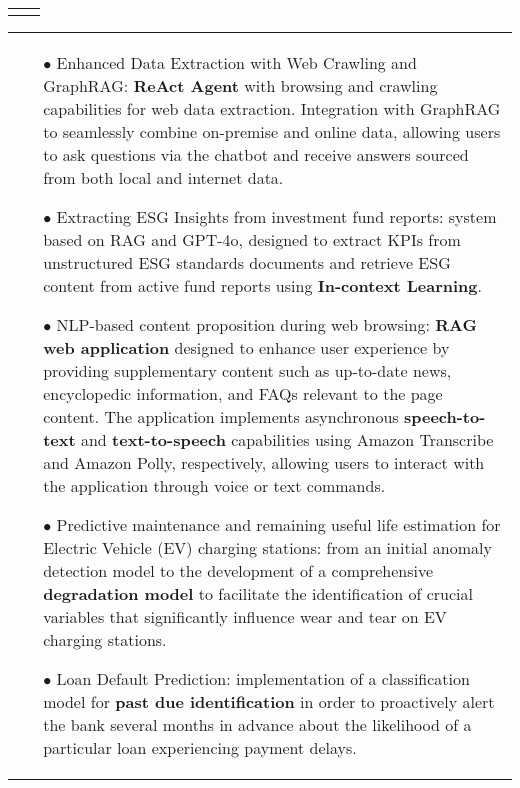 \documentclass[11pt,a4paper,sans,english]{moderncv}
\makeatletter
\renewcommand*{\cventry}[6][.25em]{%
	\vspace{1.5mm}%
	\begin{tabular*}{\textwidth}{@{\extracolsep{\fill}}ll}%
		\ifthenelse{\equal{#3}{}}{}{\textbf{#3}} &
		\ifthenelse{\equal{#2}{}}{}{#4 #6 #2}\\%
	\end{tabular*}%
	\par\addvspace{#1}}
\newcommand*{\mycvitem}[2][.25em]{%
	\vspace{-.25em}
	\begin{tabular}{@{}p{\textwidth}@{}}%
		\small#2%
	\end{tabular}%
	\par\addvspace{-0.7em}  %
}
\newcommand*{\cvtag}[1]{%
	\textcolor{lightgray!50!black}{\fbox{\mathstrut\scriptsize\textsf{\textbf{#1}}}}%
}
\makeatother
\begin{document}
	\cventry{\textcolor{gray}{\scalebox{0.8}\faCalendar} 03/2023--12/2024}{Machine Learning Engineer}{\textcolor{gray}{\scalebox{0.8}\faBuilding} \href{https://www.linksmt.it/}{\textit{Links Management \& Technology}} }{}{\textcolor{gray}{\scalebox{0.8}\faMapMarker} Bari }{}
	\mycvitem
	{
		\vspace*{-.6cm}
		\begin{flushleft}
			\noindent
			\cvtag{Python} \cvtag{Java} \cvtag{Docker} \cvtag{Gitlab CI/CD} \cvtag{LangChain} \cvtag{Milvus} \cvtag{Amazon Web Services: EC2, S3, Lambda, Transcribe, Polly, SNS, EventBridge} \cvtag{Pandas} \cvtag{FastAPI}  \cvtag{Spring Boot} \cvtag{Git} \cvtag{Keras} \cvtag{Redis}
			\cvtag{PostgreSQL} \cvtag{Keycloak} \cvtag{Mosquitto} \cvtag{KNIME} \cvtag{Nginx}
		\end{flushleft}
		\vspace*{-.2cm}
		\begin{itemize}
			\item[$\bullet$] Enhanced Data Extraction with Web Crawling and GraphRAG: \textbf{ReAct Agent} with browsing and crawling capabilities for web data extraction. Integration with GraphRAG to seamlessly combine on-premise and online data, allowing users to ask questions via the chatbot and receive answers sourced from both local and internet data.
			\item[$\bullet$] Extracting ESG Insights from investment fund reports: system based on RAG and GPT-4o, designed to extract KPIs from unstructured ESG standards documents and retrieve ESG content from active fund reports using \textbf{In-context Learning}.
			\item[$\bullet$] NLP-based content proposition during web browsing: \textbf{RAG web application} designed to enhance user experience by providing supplementary content such as up-to-date news, encyclopedic information, and FAQs relevant to the page content. The application implements asynchronous \textbf{speech-to-text} and \textbf{text-to-speech} capabilities using Amazon Transcribe and Amazon Polly, respectively, allowing users to interact with the application through voice or text commands.
			\item[$\bullet$] Predictive maintenance and remaining useful life estimation for Electric Vehicle (EV) charging stations: from an initial anomaly detection model to the development of a comprehensive \textbf{degradation model} to facilitate the identification of crucial variables that significantly influence wear and tear on EV charging stations.
			\item[$\bullet$] Loan Default Prediction: implementation of a classification model for \textbf{past due identification} in order to proactively alert the bank several months in advance about the likelihood of a particular loan experiencing payment delays.

\end{itemize}}
\end{document}
